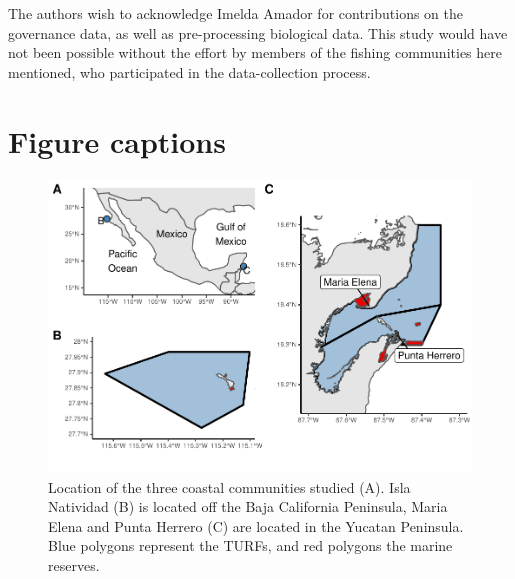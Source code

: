 \documentclass{frontiersSCNS}
\begin{document}
The authors wish to acknowledge Imelda Amador for contributions on the
governance data, as well as pre-processing biological data. This study
would have not been possible without the effort by members of the
fishing communities here mentioned, who participated in the
data-collection process.

\clearpage




\clearpage

\section*{Figure captions}

\begin{figure}
\centering
\includegraphics{Villasenor-Derbez_files/figure-latex/unnamed-chunk-7-1.pdf}
\caption{\label{fig:unnamed-chunk-7}\label{fig:map}Location of the three
coastal communities studied (A). Isla Natividad (B) is located off the
Baja California Peninsula, Maria Elena and Punta Herrero (C) are located
in the Yucatan Peninsula. Blue polygons represent the TURFs, and red
polygons the marine reserves.}
\end{figure}
\end{document}
